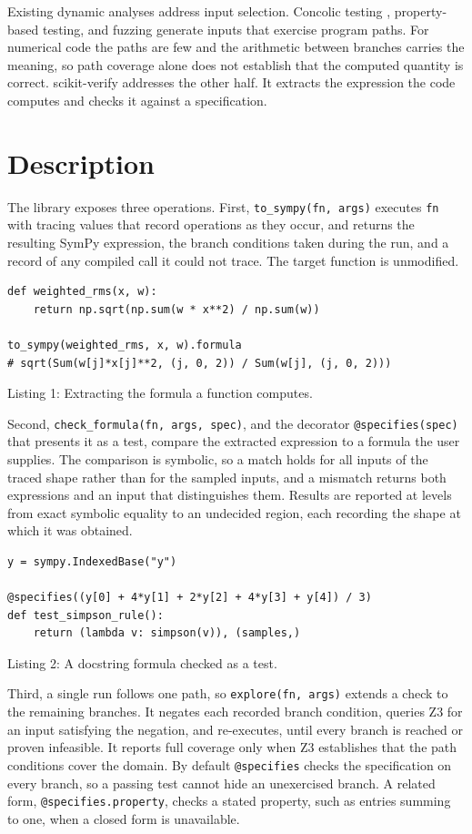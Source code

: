 \documentclass[twoside,11pt]{article}
\begin{document}
Existing dynamic analyses address input selection. Concolic testing
\citep{godefroid2005}, property-based testing, and fuzzing generate
inputs that exercise program paths. For numerical code the paths are
few and the arithmetic between branches carries the meaning, so path
coverage alone does not establish that the computed quantity is
correct. scikit-verify addresses the other half. It extracts the
expression the code computes and checks it against a specification.

\section{Description}

The library exposes three operations. First, \verb|to_sympy(fn, args)|
executes \verb|fn| with tracing values that record operations as they
occur, and returns the resulting SymPy expression, the branch
conditions taken during the run, and a record of any compiled call it
could not trace. The target function is unmodified.

\begin{verbatim}
def weighted_rms(x, w):
    return np.sqrt(np.sum(w * x**2) / np.sum(w))

to_sympy(weighted_rms, x, w).formula
# sqrt(Sum(w[j]*x[j]**2, (j, 0, 2)) / Sum(w[j], (j, 0, 2)))
\end{verbatim}
\vskip -0.05in
\centerline{\small Listing 1: Extracting the formula a function computes.}
\vskip 0.05in

Second, \verb|check_formula(fn, args, spec)|, and the decorator
\verb|@specifies(spec)| that presents it as a test, compare the
extracted expression to a formula the user supplies. The comparison is
symbolic, so a match holds for all inputs of the traced shape rather
than for the sampled inputs, and a mismatch returns both expressions
and an input that distinguishes them. Results are reported at levels
from exact symbolic equality to an undecided region, each recording the
shape at which it was obtained.

\begin{verbatim}
y = sympy.IndexedBase("y")

@specifies((y[0] + 4*y[1] + 2*y[2] + 4*y[3] + y[4]) / 3)
def test_simpson_rule():
    return (lambda v: simpson(v)), (samples,)
\end{verbatim}
\vskip -0.05in
\centerline{\small Listing 2: A docstring formula checked as a test.}
\vskip 0.05in

Third, a single run follows one path, so \verb|explore(fn, args)|
extends a check to the remaining branches. It negates each recorded
branch condition, queries Z3 for an input satisfying the negation, and
re-executes, until every branch is reached or proven infeasible. It
reports full coverage only when Z3 establishes that the path conditions
cover the domain. By default \verb|@specifies| checks the specification
on every branch, so a passing test cannot hide an unexercised branch. A
related form, \verb|@specifies.property|, checks a stated property, such
as entries summing to one, when a closed form is unavailable.
\end{document}
